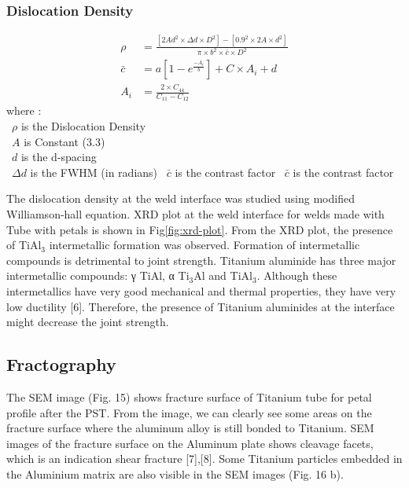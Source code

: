\documentclass[3p]{elsarticle}
\begin{document}
\subsubsection{Dislocation Density}
\label{subsec:Dislocation-Denstiy}
\begin{align} 
\rho  &= \frac{[2Ad^{2} \times \Delta d \times D^{2}]-[0.9^{2} \times 2A \times d^{2}]}{\pi \times b^{2} \times \bar{c} \times D^{2}} \label{eq:Dislocation-Denstiy} \\
\bar{c} &= a[1-e^{\frac{-A_{i}}{b}}] + C \times A_{i} + d \label{eq:C-bar} \\
A_{i} &= \frac{2 \times C_{44}}{C_{11} - C_{12}} \label{eq:ai}
\end{align}
where :\\
~$\rho$ is the Dislocation Density \\
~$A$ is Constant (3.3) \\
~$d$ is the d-spacing \\
~$\Delta d$ is the FWHM (in radians)
~$\bar{c}$ is the contrast factor
~$\bar{c}$ is the contrast factor

The dislocation density at the weld interface was studied using modified Williamson-hall equation.
XRD plot at the weld interface for welds made with Tube with petals is shown in Fig\ref{fig:xrd-plot}. From the XRD plot, the presence of TiAl$_{3}$ intermetallic formation was observed. Formation of intermetallic compounds is detrimental to joint strength. Titanium aluminide has three major intermetallic compounds: γ TiAl, α Ti$_{3}$Al and TiAl$_{3}$. Although these intermetallics have very good mechanical and thermal properties, they have very low ductility [6]. Therefore, the presence of Titanium aluminides at the interface might decrease the joint strength.



\subsection{Fractography}
\label{subsec:Fractography}
The SEM image (Fig. 15) shows fracture surface of Titanium tube for petal profile after the PST. From the image, we can clearly see some areas on the fracture surface where the aluminum alloy is still bonded to Titanium. SEM images of the fracture surface on the Aluminum plate shows cleavage facets, which is an indication shear fracture [7],[8]. Some Titanium particles embedded in the Aluminium matrix are also visible in
the SEM images (Fig. 16 b).
\end{document}
